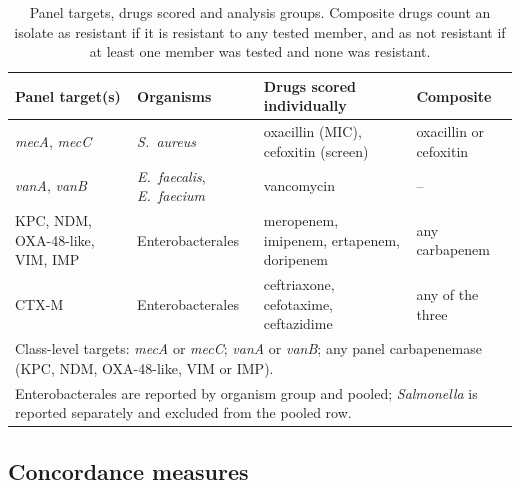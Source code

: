 \documentclass[10pt,twocolumn,letterpaper]{article}
\newcommand{\g}[1]{\textit{#1}}  %
\newcommand{\sau}{\textit{S.~aureus}}
\begin{document}
\begin{table}[t]
\caption{Panel targets, drugs scored and analysis groups. Composite drugs count an isolate as resistant if it is resistant
to any tested member, and as not resistant if at least one member was tested and none was resistant.}
\label{tab:pairs}
\centering\footnotesize
\begin{tabular}{llll}
\hline\hline
Panel target(s) & Organisms & Drugs scored individually & Composite \\
\hline
\g{mecA}, \g{mecC} & \sau{} & oxacillin (MIC), cefoxitin (screen) & oxacillin or cefoxitin \\
\g{vanA}, \g{vanB} & \textit{E.~faecalis}, \textit{E.~faecium} & vancomycin & -- \\
KPC, NDM, OXA-48-like, VIM, IMP & Enterobacterales & meropenem, imipenem, ertapenem, doripenem & any carbapenem \\
CTX-M & Enterobacterales & ceftriaxone, cefotaxime, ceftazidime & any of the three \\
\hline
\multicolumn{4}{l}{Class-level targets: \g{mecA} or \g{mecC}; \g{vanA} or \g{vanB}; any panel carbapenemase (KPC, NDM,
OXA-48-like, VIM or IMP).}\\
\multicolumn{4}{l}{Enterobacterales are reported by organism group and pooled; \textit{Salmonella} is reported
separately and excluded from the pooled row.}\\
\hline\hline
\end{tabular}
\end{table}

\subsection{Concordance measures}
\end{document}
